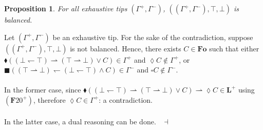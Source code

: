 \documentclass[draft]{article}
\newtheorem{proposition}{Proposition}
\newenvironment{proof}{{\bf Proof:}}{~$\dashv$\\}
\def\Formula{\mathbf{A}}
\def\Formula{\mathbf{F}}
\def\Rule{\mathbf{R}}
\def\Fo{\mathbf{Fo}}
\def\L{\mathbf{L}}
\begin{document}
%
%
\begin{proposition}\label{Proposition:for:all:exhaustive:tips:is:balanced}
%
%
For all exhaustive tips $(\Gamma^{+},\Gamma^{-})$, $((\Gamma^{+},\Gamma^{-}),{\top},{\bot})$ is balanced.
%
%
\end{proposition}
%
%
\begin{proof}
%
%
Let $(\Gamma^{+},\Gamma^{-})$ be an exhaustive tip.
For the sake of the contradiction, suppose $((\Gamma^{+},\Gamma^{-}),{\top},{\bot})$ is not balanced.
Hence, there exists $C{\in}\Fo$ such that either ${\blacklozenge}(({\bot}{\leftharpoondown}{\top}){\rightharpoonup}({\top}{\rightharpoonup}{\bot}){\vee}C){\in}\Gamma^{+}$ and ${\lozenge}C{\not\in}\Gamma^{+}$, or ${\blacksquare}(({\top}{\rightharpoonup}{\bot}){\leftharpoondown}({\bot}{\leftharpoondown}{\top}){\wedge}C){\in}\Gamma^{-}$ and ${\square}C{\not\in}\Gamma^{-}$.
%
%
\\
\\
%
%
In the former case, since ${\blacklozenge}(({\bot}{\leftharpoondown}{\top}){\rightharpoonup}({\top}{\rightharpoonup}{\bot}){\vee}C){\rightharpoonup}{\lozenge}C{\in}\L^{+}$ using $(\Formula20^{+})$, therefore ${\lozenge}C{\in}\Gamma^{+}$: a contradiction.
%
%
\\
\\
%
%
In the latter case, a dual reasoning can be done.
%
%
\medskip
%
%
\end{proof}
%
%
%
%
\end{document}
